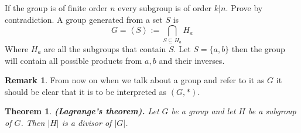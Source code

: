 \documentclass[11pt,a4paper]{article}
\theoremstyle{definition}
\newtheorem{remark}{Remark}[section]
\theoremstyle{plain}
\newtheorem{theorem}{Theorem}[section]
\renewcommand{\tt}[1]{\textnormal{\textbf{(#1).}}} %
\begin{document}
  If the group is of finite order $n$ every subgroup is of order $k|n$.
  Prove by contradiction.
  A group generated from a set $S$ is
  \[
    G = \left<S\right> := \bigcap_{S \subseteq H_a}{H_a}
  \]
  Where $H_a$ are all the subgroups that contain $S$.
  Let $S = \{a,b\}$ then the group will contain all possible products 
  from $a,b$ and their inverses.


  \begin{remark}
    From now on when we talk about a group and refer to it as $G$ it should
    be clear that it is to be interpreted as $(G,*)$.
  \end{remark}

  \begin{theorem}\tt{Lagrange's theorem}
    Let $G$ be a group and let $H$ be a subgroup of $G$.
    Then $|H|$ is a divisor of $|G|$.
  \end{theorem}
  
\end{document}
